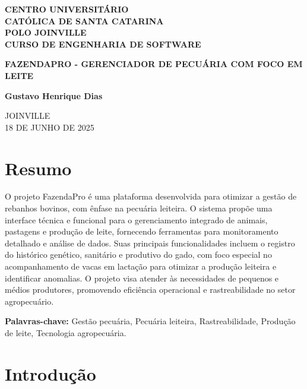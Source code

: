 \documentclass[12pt, a4paper]{article}
\begin{document}
\begin{titlepage}
    \centering
    \vspace*{1cm}
    {\large\bfseries CENTRO UNIVERSITÁRIO\\ CATÓLICA DE SANTA CATARINA\\
    POLO JOINVILLE\\
    CURSO DE ENGENHARIA DE SOFTWARE}\par
    \vspace{2cm}
    {\Large\bfseries FAZENDAPRO - GERENCIADOR DE PECUÁRIA COM FOCO EM LEITE}\par
    \vspace{2cm}
    {\normalsize\bfseries Gustavo Henrique Dias}\par
    \vspace{1cm}
    \vspace{3cm}
    {\normalsize JOINVILLE\\
    18 DE JUNHO DE 2025}\par
\end{titlepage}

\tableofcontents
\newpage

\section*{Resumo}
\begin{spacing}{1.5}
O projeto FazendaPro é uma plataforma desenvolvida para otimizar a gestão de rebanhos bovinos, com ênfase na pecuária leiteira. O sistema propõe uma interface técnica e funcional para o gerenciamento integrado de animais, pastagens e produção de leite, fornecendo ferramentas para monitoramento detalhado e análise de dados. Suas principais funcionalidades incluem o registro do histórico genético, sanitário e produtivo do gado, com foco especial no acompanhamento de vacas em lactação para otimizar a produção leiteira e identificar anomalias. O projeto visa atender às necessidades de pequenos e médios produtores, promovendo eficiência operacional e rastreabilidade no setor agropecuário.
\end{spacing}
\vspace{0.5cm}
\textbf{Palavras-chave:} Gestão pecuária, Pecuária leiteira, Rastreabilidade, Produção de leite, Tecnologia agropecuária.
\newpage

\section{Introdução}
\end{document}
